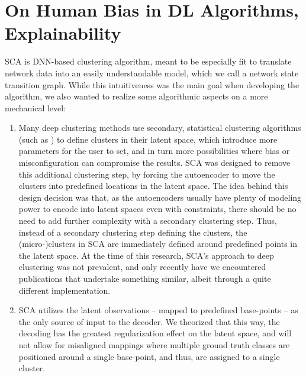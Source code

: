 	\section{On Human Bias in DL Algorithms, Explainability}
		\label{cha:sparse_clust:sec:bias}
		
		\ac{SCA} is \ac{DNN}-based clustering algorithm, meant to be especially fit to translate network data into an easily understandable model, which we call a network state transition graph.
		While this intuitiveness was the main goal when developing the algorithm, we also wanted to realize some algorithmic aspects on a more mechanical level:
		\begin{enumerate}[label=\textbf{\alph*})]
			\item
				Many deep clustering methods use secondary, statistical clustering algorithms (such as \kmeans{}) to define clusters in their latent space, which introduce more parameters for the user to set, and in turn more possibilities where bias or misconfiguration can compromise the results.
				\ac{SCA} was designed to remove this additional clustering step, by forcing the autoencoder to move the clusters into predefined locations in the latent space.
				The idea behind this design decision was that, as the autoencoders usually have plenty of modeling power to encode into latent spaces even with constraints, there should be no need to add further complexity with a secondary clustering step.
				Thus, instead of a secondary clustering step defining the clusters, the (micro-)clusters in \ac{SCA} are immediately defined around predefined points in the latent space.
				At the time of this research, \ac{SCA}'s approach to deep clustering was not prevalent, and only recently have we encountered publications that undertake something similar, albeit through a quite different implementation.
			
			\item
				\ac{SCA} utilizes the latent observations -- mapped to predefined base-points -- as the only source of input to the decoder.
				We theorized that this way, the decoding has the greatest regularization effect on the latent space, and will not allow for misaligned mappings where multiple ground truth classes are positioned around a single base-point, and thus, are assigned to a single cluster.
		\end{enumerate}
		
